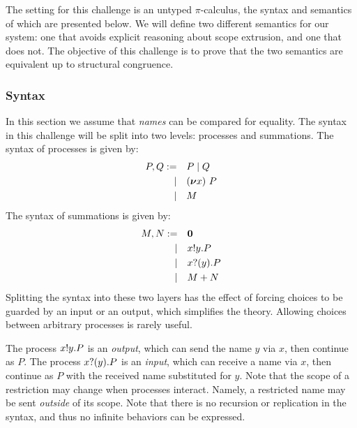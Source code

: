 The setting for this challenge is an untyped \( \pi \)-calculus, the syntax and semantics of which are presented below.
We will define two different semantics for our system: one that avoids explicit reasoning about scope extrusion, and one that does not.
The objective of this challenge is to prove that the two semantics are equivalent up to structural congruence.

\subsubsection{Syntax}
In this section we assume that \emph{names}  can be compared for equality.
The syntax in this challenge will be split into two levels: processes and summations.
The syntax of processes is given by:
\begin{align*}
  P,Q :=&&& P \mid Q \\
  |&&& (\bm{\nu} x)~P \\
  |&&& M
\end{align*}
The syntax of summations is given by:
\begin{align*}
  M,N :=&&& \bm{0} \\
  |&&& x ! y . P \\
  |&&& x ? (y) . P \\
  |&&& M + N
\end{align*}
Splitting the syntax into these two layers has the effect of forcing choices to be guarded by an input or an output, which simplifies the theory.
Allowing choices between arbitrary processes is rarely useful.

The process \( x ! y . P \) is an \emph{output}, which can send the name \( y \) via \( x \), then continue as \( P \).
The process \( x ? (y) . P \) is an \emph{input}, which can receive a name via \( x \), then continue as \( P \) with the received name substituted for \( y \).
Note that the scope of a restriction may change when processes interact. Namely, a restricted name may be sent \emph{outside} of its scope.
Note that there is no recursion or replication in the syntax, and thus no infinite behaviors can be expressed.

